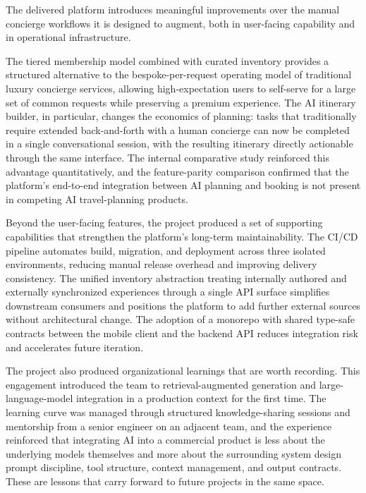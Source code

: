 The delivered platform introduces meaningful improvements over the manual concierge workflows it is designed to augment, both in user-facing capability and in operational infrastructure.

The tiered membership model combined with curated inventory provides a structured alternative to the bespoke-per-request operating model of traditional luxury concierge services, allowing high-expectation users to self-serve for a large set of common requests while preserving a premium experience. The AI itinerary builder, in particular, changes the economics of planning: tasks that traditionally require extended back-and-forth with a human concierge can now be completed in a single conversational session, with the resulting itinerary directly actionable through the same interface. The internal comparative study reinforced this advantage quantitatively, and the feature-parity comparison confirmed that the platform's end-to-end integration between AI planning and booking is not present in competing AI travel-planning products.

Beyond the user-facing features, the project produced a set of supporting capabilities that strengthen the platform's long-term maintainability. The CI/CD pipeline automates build, migration, and deployment across three isolated environments, reducing manual release overhead and improving delivery consistency. The unified inventory abstraction treating internally authored and externally synchronized experiences through a single API surface simplifies downstream consumers and positions the platform to add further external sources without architectural change. The adoption of a monorepo with shared type-safe contracts between the mobile client and the backend API reduces integration risk and accelerates future iteration.

The project also produced organizational learnings that are worth recording. This engagement introduced the team to retrieval-augmented generation and large-language-model integration in a production context for the first time. The learning curve was managed through structured knowledge-sharing sessions and mentorship from a senior engineer on an adjacent team, and the experience reinforced that integrating AI into a commercial product is less about the underlying models themselves and more about the surrounding system design prompt discipline, tool structure, context management, and output contracts. These are lessons that carry forward to future projects in the same space.

